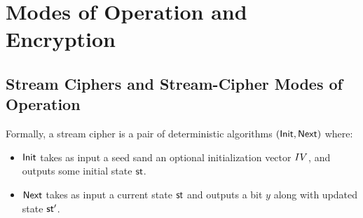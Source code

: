 \section{Modes of Operation and Encryption}


\subsection*{Stream Ciphers and Stream-Cipher Modes of Operation}



Formally, a stream cipher is a pair of deterministic algorithms
$(\textsf{Init}, \textsf{Next})$ where:
\begin{itemize}
  \item $\textsf{Init}$ takes as input a seed sand an optional initialization vector
        $IV$, and outputs some initial state $\textsf{st}$.
  \item $\textsf{Next}$ takes as input a current state $\textsf{st}$ and outputs a bit $y$
        along with updated state $\textsf{st}'$.
\end{itemize}

